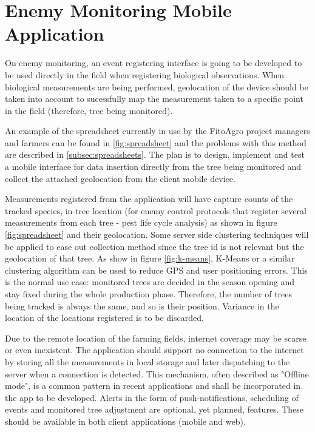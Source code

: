 \section{Enemy Monitoring Mobile Application}

On enemy monitoring, an event registering interface is going to be developed to be used directly in the field when registering biological observations. When biological measurements are being performed, geolocation of the device should be taken into account to sucessfully map the measurement taken to a specific point in the field (therefore, tree being monitored).

An example of the spreadsheet currently in use by the FitoAgro project managers and farmers can be found in \ref{fig:spreadsheet} and the problems with this method are described in \ref{subsec:spreadsheets}. The plan is to design, implement and test a mobile interface for data insertion directly from the tree being monitored and collect the attached geolocation from the client mobile device.

Measurements registered from the application will have capture counts of the tracked species, in-tree location (for enemy control protocols that register several measurements from each tree - pest life cycle analysis) as shown in figure \ref{fig:spreadsheet} and their geolocation. Some server side clustering techniques will be applied to ease out collection method since the tree id is not relevant but the geolocation of that tree. As show in figure \ref{fig:k-means}, K-Means or a similar clustering algorithm can be used to reduce GPS and user positioning errors. This is the normal use case: monitored trees are decided in the season opening and stay fixed during the whole production phase. Therefore, the number of trees being tracked is always the same, and so is their position. Variance in the location of the locations registered is to be discarded.

Due to the remote location of the farming fields, internet coverage may be scarse or even inexistent. The application should support no connection to the internet by storing all the measurements in local storage and later dispatching to the server when a connection is detected. This mechanism, often described as "Offline mode", is a common pattern in recent applications and shall be incorporated in the app to be developed. Alerts in the form of push-notifications, scheduling of events and monitored tree adjustment are optional, yet planned, features. These should be available in both client applications (mobile and web).

